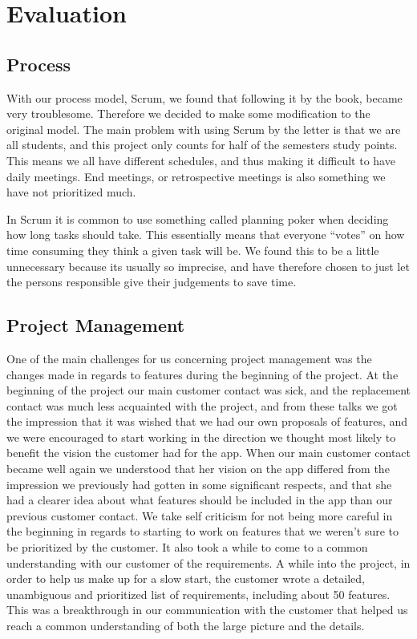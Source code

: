 \section{Evaluation}
\thispagestyle{plain}
	\subsection{Process}

With our process model, Scrum, we found that following it by the book, became very troublesome. Therefore we decided to make some modification to the original model. The main problem with using Scrum by the letter is that we are all students, and this project only counts for half of the semesters study points. This means we all have different schedules, and thus making it difficult to have daily meetings. End meetings, or retrospective meetings is also something we have not prioritized much.

In Scrum it is common to use something called planning poker when deciding how long tasks should take. This essentially means that everyone “votes” on how time consuming they think a given task will be. We found this to be a little unnecessary because its usually so imprecise, and have therefore chosen to just let the persons responsible give their judgements to save time. 

	\subsection{Project Management}

One of the main challenges for us concerning project management was the changes made in regards to features during the beginning of the project. At the beginning of the project our main customer contact was sick, and the replacement contact was much less acquainted with the project, and from these talks we got the impression that it was wished that we had our own proposals of features, and we were encouraged to start working in the direction we thought most likely to benefit the vision the customer had for the app. When our main customer contact became well again we understood that her vision on the app differed from the impression we previously had gotten in some significant respects, and that she had a clearer idea about what features should be included in the app than our previous customer contact. We take self criticism for not being more careful in the beginning in regards to starting to work on features that we weren’t sure to be prioritized by the customer. It also took a while to come to a common understanding with our customer of the requirements. A while into the project, in order to help us make up for a slow start, the customer wrote a detailed, unambiguous and prioritized list of requirements, including about 50 features. This was a breakthrough in our communication with the customer that helped us reach a common understanding of both the large picture and the details.

